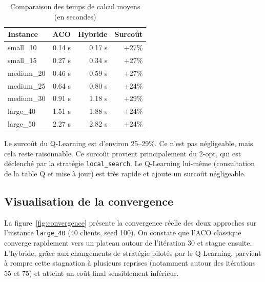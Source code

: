 \documentclass[12pt, a4paper]{article}
\begin{document}
\begin{table}[H]
\centering
\caption{Comparaison des temps de calcul moyens (en secondes)}
\label{tab:times}
\begin{tabular}{l r r r}
\toprule
\textbf{Instance} & \textbf{ACO} & \textbf{Hybride} & \textbf{Surcoût} \\
\midrule
small\_10 & 0.14 s & 0.17 s & +27\% \\
small\_15 & 0.27 s & 0.34 s & +27\% \\
medium\_20 & 0.46 s & 0.59 s & +27\% \\
medium\_25 & 0.64 s & 0.80 s & +24\% \\
medium\_30 & 0.91 s & 1.18 s & +29\% \\
large\_40 & 1.51 s & 1.88 s & +24\% \\
large\_50 & 2.27 s & 2.82 s & +24\% \\
\bottomrule
\end{tabular}
\end{table}

Le surcoût du Q-Learning est d'environ 25--29\%. Ce n'est pas négligeable, mais cela reste raisonnable. Ce surcoût provient principalement du 2-opt, qui est déclenché par la stratégie \texttt{local\_search}. Le Q-Learning lui-même (consultation de la table Q et mise à jour) est très rapide et ajoute un surcoût négligeable.

\subsection{Visualisation de la convergence}

La figure~\ref{fig:convergence} présente la convergence réelle des deux approches sur l'instance \texttt{large\_40} (40 clients, seed 100). On constate que l'ACO classique converge rapidement vers un plateau autour de l'itération 30 et stagne ensuite. L'hybride, grâce aux changements de stratégie pilotés par le Q-Learning, parvient à rompre cette stagnation à plusieurs reprises (notamment autour des itérations 55 et 75) et atteint un coût final sensiblement inférieur.
\end{document}
